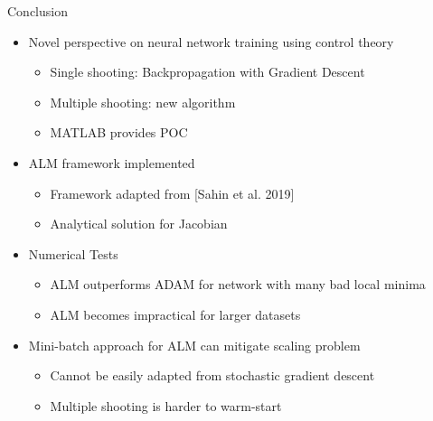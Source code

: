 \documentclass[11pt,t]{beamer}
\begin{document}
\begin{frame}[fragile]{Conclusion}
	\begin{itemize}
		\item Novel perspective on neural network training using control theory
		\begin{itemize}
			\item Single shooting: Backpropagation with Gradient Descent
			\item Multiple shooting: new algorithm
			\item MATLAB provides POC
		\end{itemize}
		\item ALM framework implemented
		\begin{itemize}
			\item Framework adapted from [Sahin et al. 2019]
			\item Analytical solution for Jacobian
		\end{itemize}
		\item Numerical Tests
		\begin{itemize}
			\item ALM outperforms ADAM for network with many bad local minima
			\item ALM becomes impractical for larger datasets
		\end{itemize}
		\item Mini-batch approach for ALM can mitigate scaling problem
		\begin{itemize}
			\item Cannot be easily adapted from stochastic gradient descent
			\item Multiple shooting is harder to warm-start
		\end{itemize}
	\end{itemize}
\end{frame}
\end{document}

